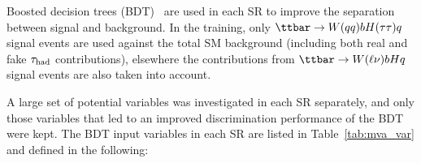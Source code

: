 Boosted decision trees (BDT)~\cite{Breiman:1984jka,Friedman:2002we,Freund:1997xna} are used in each SR to improve the separation between signal and background. 
In the training, only $\ttbar \to W(qq)bH(\tau\tau)q$ signal events are used against the total SM background (including both real and fake $\tau_{\mathrm{had}}$ contributions), 
elsewhere the contributions from $\ttbar \to W(\ell\nu)bHq$ signal events are also taken into account. 

A large set of potential variables was investigated in each SR separately, and only those variables that led to an improved discrimination
performance of the BDT were kept.  The BDT input variables in each SR are listed in Table~\ref{tab:mva_var} and defined in the following:

